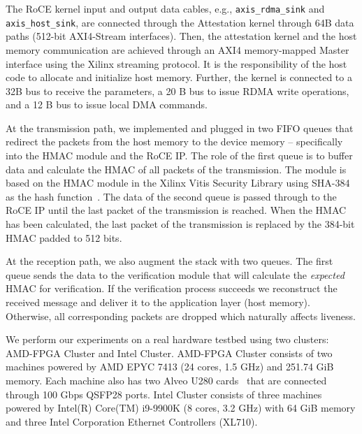 The RoCE kernel input and output data cables, e.g., \texttt{axis\_rdma\_sink} and \texttt{axis\_host\_sink}, are connected through the Attestation kernel through 64B data paths (512-bit AXI4-Stream interfaces). Then, the attestation kernel and the host memory communication are achieved through an AXI4 memory-mapped Master interface using the Xilinx streaming protocol. It is the responsibility of the host code to allocate and initialize host memory. Further, the kernel is connected to a 32B bus to receive the parameters, a 20 B bus to issue RDMA write operations, and a 12 B bus to issue local DMA commands.

At the transmission path, we implemented and plugged in two FIFO queues that redirect the packets from the host memory to the device memory -- specifically into the HMAC module and the RoCE IP. The role of the first queue is to buffer data and calculate the HMAC of all packets of the transmission.
The module is based on the HMAC module in the Xilinx Vitis Security Library using SHA-384 as the hash function~\cite{vitis-security-lib}.
The data of the second queue is passed through to the RoCE IP until the last packet of the transmission is reached.
When the HMAC has been calculated, the last packet of the transmission is replaced by the 384-bit HMAC padded to 512 bits.

At the reception path, we also augment the stack with two queues.
The first queue sends the data to the verification module that will calculate the {\em expected} HMAC for verification. If the verification process succeeds we reconstruct the received message and deliver it to the application layer (host memory). Otherwise, all corresponding packets are dropped which naturally affects liveness.
\fi 

We perform our experiments on a real hardware testbed using two clusters: AMD-FPGA Cluster and Intel Cluster. AMD-FPGA Cluster consists of two machines powered by AMD EPYC 7413 (24 cores, 1.5 GHz) and 251.74 GiB memory. Each machine also has two Alveo U280 cards~\cite{u280_smartnics} that are connected through 100 Gbps QSFP28 ports. Intel Cluster consists of three machines powered by Intel(R) Core(TM) i9-9900K (8 cores, 3.2 GHz) with 64 GiB memory and three Intel Corporation Ethernet Controllers (XL710).





